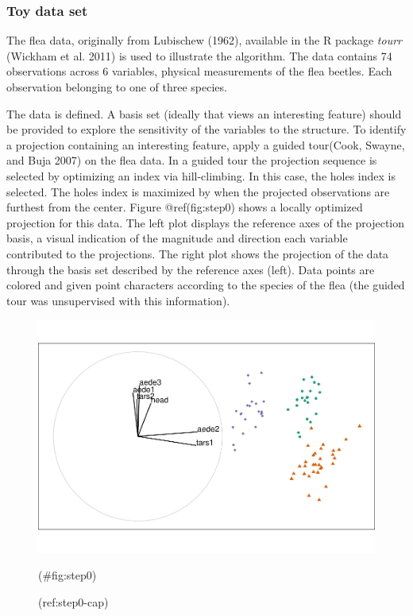\hypertarget{toy-data-set}{%
\subsubsection{Toy data set}\label{toy-data-set}}

The flea data, originally from Lubischew (1962), available in the R package \emph{tourr} (Wickham et al. 2011) is used to illustrate the algorithm. The data contains 74 observations across 6 variables, physical measurements of the flea beetles. Each observation belonging to one of three species.

The data is defined. A basis set (ideally that views an interesting feature) should be provided to explore the sensitivity of the variables to the structure. To identify a projection containing an interesting feature, apply
a guided tour(Cook, Swayne, and Buja 2007) on the flea data. In a guided tour the projection sequence is selected by optimizing an index via hill-climbing. In this case, the holes index is selected. The holes index is maximized by when the projected observations are furthest from the center. Figure @ref(fig:step0) shows a locally optimized projection for this data. The left plot displays the reference axes of the projection basis, a visual indication of the magnitude and direction each variable contributed to the projections. The right plot shows the projection of the data through the basis set described by the reference axes (left). Data points are colored and given point characters according to the species of the flea (the guided tour was unsupervised with this information).

\begin{Schunk}
\begin{figure}

{\centering \includegraphics[width=0.95\linewidth]{spinifex_paper_files/figure-latex/step0-1} 

}

\caption[(ref:step0-cap)]{(ref:step0-cap)}(\#fig:step0)
\end{figure}
\end{Schunk}

